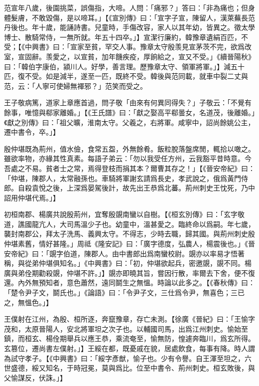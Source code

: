 范宣年八歲，後園挑菜，誤傷指，大啼。人問：「痛邪？」答曰：「非為痛也；但身體髮膚，不敢毀傷，是以啼耳。」【《宣別傳》曰：「宣字子宣，陳留人，漢萊蕪長范丹後也。年十歲，能誦詩書。兒童時，手傷改容，家人以其年幼，皆異之。徵太學博士、散騎常侍，⼀無所就。年五十四卒。」】宣潔行廉約，韓豫章遺絹百匹，不受；【《中興書》曰：「宣家至貧，罕交人事。豫章太守殷羡見宣茅茨不完，欲爲改室，宣固辭。羡愛之，以宣貧，加年饑疾疫，厚餉給之，宣又不受。」《續晉陽秋》曰：「韓伯字康伯，潁川人。好學，善言理。歷豫章太守、領軍將軍。」】減五十匹，復不受。如是減半，遂至一匹，既終不受。韓後與范同載，就車中裂二丈與范，云：「人寧可使婦無褌邪？」范笑而受之。

王子敬病篤，道家上章應首過，問子敬「由來有何異同得失？」子敬云：「不覺有餘事，唯憶與郗家離婚。」【《王氏譜》曰：「獻之娶高平郗曇女，名道茂，後離婚。」《獻之別傳》曰：「祖父曠，淮南太守。父羲之，右將軍。咸寧中，詔尚餘姚公主，遷中書令，卒。」】

殷仲堪既為荊州，值水儉，食常五盌，外無餘肴。飯粒脫落盤席閒，輒拾以噉之。雖欲率物，亦緣其性真素。每語子弟云：「勿以我受任方州，云我豁平昔時意。今吾處之不易。貧者士之常，焉得登枝而捐其本？爾曹其存之！」【《晉安帝紀》曰：「仲堪，陳郡人，太常融孫也。車騎將軍謝玄請爲長史，孝武說之，俄爲黃門侍郎。自殺袁悅之後，上深爲晏駕後計，故先出王恭爲北蕃。荊州刺史王忱死，乃中詔用仲堪代焉。」】

初桓南郡、楊廣共說殷荊州，宜奪殷覬南蠻以自樹。【《桓玄別傳》曰：「玄字敬道，譙國龍亢人，大司馬溫少子也。幼童中，溫甚愛之。臨終命以爲嗣。年七歲，襲封南郡公，拜太子洗馬、義興太守。不得志，少時去職，歸其國。與荊州刺史殷仲堪素舊，情好甚隆。」周祗《隆安記》曰：「廣字德度，弘農人，楊震後也。」《晉安帝紀》曰：「覬字伯道，陳郡人。由中書郎出爲南蠻校尉。覬亦以率易才悟著稱，與從弟仲堪俱知名。」《中興書》曰：「初，仲堪欲起兵，密邀覬，覬不同。楊廣與弟佺期勸殺覬，仲堪不許。」】覬亦即曉其旨，嘗因行散，率爾去下舍，便不復還。內外無預知者，意色蕭然，遠同鬬生之無慍。時論以此多之。【《春秋傳》曰：「楚令尹子文，鬬氏也。」《論語》曰：「令尹子文，三仕爲令尹，無喜色；三已之，無慍色。」】

王僕射在江州，為殷、桓所逐，奔竄豫章，存亡未測。【徐廣《晉紀》曰：「王愉字茂和，太原晉陽人，安北將軍坦之次子也。以輔國司馬，出爲江州刺史。愉始至鎮，而桓玄、楊佺期舉兵以應王恭，乘流奄至，愉無防，惶遽奔臨川，爲玄所得。玄篡位，遷尚書左僕射。」】王綏在都，既憂戚在貌，居處飲食，每事有降。時人謂為試守孝子。【《中興書》曰：「綏字彥猷，愉子也。少有令譽。自王渾至坦之，六世盛德，綏又知名，于時冠冕，莫與爲比。位至中書令、荊州刺史。桓玄敗後，與父愉謀反，伏誅。」】

